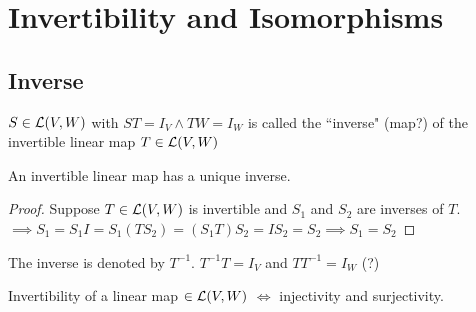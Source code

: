 \section{Invertibility and Isomorphisms}

\subsection{Inverse}
\setcounter{thm}{58}
\begin{mydef}
    $S\in {\mathcal{L}(V,W)}$ with $ST=I_V \wedge TW = I_W$ is called the ``inverse" (map?) of the invertible linear map $T \in {\mathcal{L}(V,W)}$ 
\end{mydef}

\begin{thm}
    An invertible  linear map has a unique inverse. 
\end{thm}
\begin{proof}
    Suppose $T\in {\mathcal{L}(V,W)}$ is invertible and $S_1$ and $S_2$ are inverses of $T$. $\implies S_1 = S_1 I = S_1 (T S_2) = (S_1 T) S_2 = I S_2 = S_2 \implies S_1 = S_2$ 
\end{proof}

\begin{thm}
    The inverse is denoted by $T^{-1}$. $T^{-1}T=I_V$ and $T T^{-1} = I_W$ (?)
\end{thm}

\begin{thm}
    Invertibility of a linear map $\in {\mathcal{L}(V,W)}$ $\Leftrightarrow$ injectivity and surjectivity.
\end{thm}

